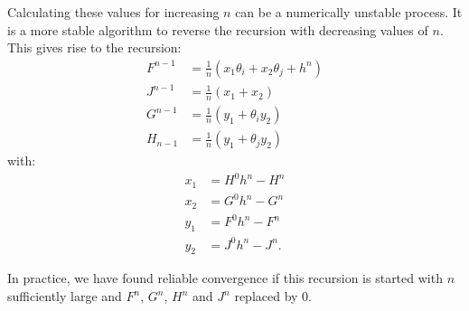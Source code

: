 Calculating these values for increasing $n$ can be a numerically unstable process. It is a more stable algorithm to reverse the recursion with decreasing values of $n$. This gives rise to the recursion:
\begin{align*}
  F^{n-1} & = \frac{1}{n}\left( x_1 \theta_i + x_2 \theta_j + h^n \right) \\
  J^{n-1} & = \frac{1}{n}\left( x_1  + x_2\right)                         \\
  G^{n-1} & = \frac{1}{n}\left( y_1  + \theta_i y_2\right)                \\
  H_{n-1} & = \frac{1}{n}\left( y_1  + \theta_j y_2\right)
\end{align*}
with:
\begin{align*}
  x_1 & = H^{0} h^n - H^n             \\
  x_2 & = G^0 h^n - G^n               \\
  y_1 & = F^{0} h^n - F^{n}           \\
  y_2 & = J^{0} h^n - J^{n}  \text{.}
\end{align*}

In practice, we have found reliable convergence if this recursion is started with $n$ sufficiently large and $F^n$, $G^n$, $H^n$ and $J^n$ replaced by $0$.

